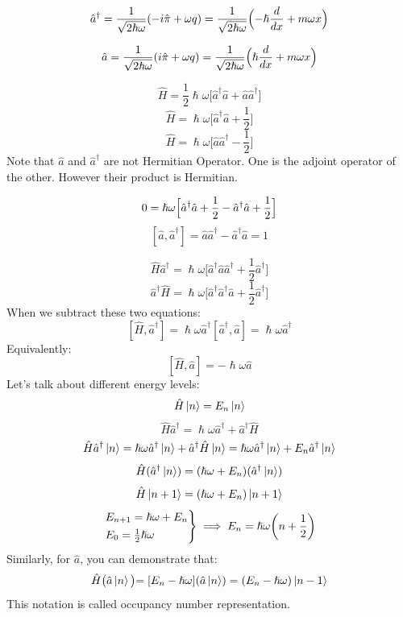 \documentclass{article}
\begin{document}
$$\hat{a}^{\dag} = \frac{1}{\sqrt{2\hslash\omega}} ( -i\hat{\pi}+\omega q) = \frac{1}{\sqrt{2\hslash\omega}} \Bigl( -\hslash\frac{d}{dx}+ m\omega x \Bigl)$$

$$\hat{a} = \frac{1}{\sqrt{2\hslash\omega}} (i\hat{\pi}+\omega q) = \frac{1}{\sqrt{2\hslash\omega}} \Bigl(\hslash\frac{d}{dx}+ m\omega x \Bigl)$$

$$\hat{H} = \frac{1}{2} \hslash \omega \bigl[\hat{a}^{\dag}\hat{a} +\hat{a}\hat{a}^{\dag} \bigl] $$
$$\hat{H} = \hslash \omega \bigl[ \hat{a}^{\dag} \hat{a} + \frac{1}{2}\bigl] $$
$$\hat{H} = \hslash \omega \bigl[\hat{a} \hat{a}^{\dag} - \frac{1}{2}\bigl] $$
Note that $\hat{a}$ and $\hat{a}^{\dag}$ are not Hermitian Operator. One is the adjoint operator of the other. However their product is Hermitian.

$$ 0 = \hslash \omega \Bigl[ \hat{a}^{\dag} \hat{a} + \frac{1}{2} - \hat{a}^{\dag}\hat{a} + \frac{1}{2} \Bigl] $$
$$[\hat{a},\hat{a}^{\dag}] = \hat{a}\hat{a}^{\dag} - \hat{a}^{\dag}\hat{a} = 1$$

$$\hat{H}\hat{a}^{\dag} = \hslash \omega \bigl[ \hat{a}^{\dag}\hat{a}\hat{a}^{\dag}+ \frac{1}{2}\hat{a}^{\dag} \bigl] $$
$$\hat{a}^{\dag} \hat{H} =  \hslash \omega \bigl[ \hat{a}^{\dag}\hat{a}^{\dag}\hat{a}+ \frac{1}{2}\hat{a}^{\dag} \bigl]$$
When we subtract these two equations:
$$ [\hat{H}, \hat{a}^{\dag}] = \hslash\omega\hat{a}^{\dag}[\hat{a}^{\dag},\hat{a}] = \hslash\omega\hat{a}^{\dag} $$
Equivalently:
$$[\hat{H}, \hat{a}] = -\hslash\omega\hat{a}$$
Let's talk about different energy levels:
$$\hat{H}\ket{n} = E_n \ket{n}$$
$$ \hat{H}\hat{a}^{ \dag} = \hslash \omega \hat{a}^{\dag} + \hat{a}^{\dag}\hat{H}$$
$$\hat{H}\hat{a}^{\dag} \ket{n} = \hslash \omega \hat{a}^{\dag} \ket{n} + \hat{a}^{\dag}\hat{H}\ket{n} = \hslash\omega\hat{a}^{\dag}\ket{n} + E_n \hat{a}^{\dag}\ket{n}$$
$$\hat{H}(\hat{a}^{\dag}\ket{n}) = (\hslash\omega+E_n)(\hat{a}^{\dag}\ket{n})$$
$$\hat{H}\ket{n+1} = (\hslash\omega + E_n ) \ket{n+1}$$
\begin{equation*}
\begin{rcases}
  E_{n+1} = \hslash \omega + E_n \\
  E_0= \frac{1}{2} \hslash \omega \\
\end{rcases}
\implies E_n = \hslash \omega \biggl( n + \frac{1}{2} \biggl)
\end{equation*} 
Similarly, for $\hat{a}$, you can demonstrate that:
$$\hat{H}\bigl( \hat{a}\ket{n} \bigl) = [E_n -\hslash \omega ] (\hat{a}\ket{n}) = (E_n -\hslash \omega) \ket{n-1} $$
This notation is called occupancy number representation.
\end{document}
